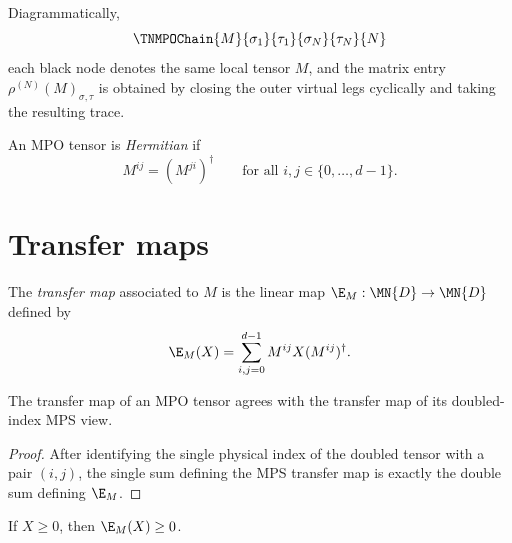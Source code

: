 Diagrammatically,
\[
    \TNMPOChain{M}{\sigma_1}{\tau_1}{\sigma_N}{\tau_N}{N}
\]
each black node denotes the same local tensor $M$, and the matrix entry
$\rho^{(N)}(M)_{\sigma,\tau}$ is obtained by closing the outer virtual
legs cyclically and taking the resulting trace.

\begin{definition}\label{def:mpo_hermitian}
    \leanok
    An MPO tensor is \emph{Hermitian} if
    \[
        M^{ij} = (M^{ji})^\dagger
        \qquad \text{for all } i,j \in \{0,\ldots,d{-}1\}.
    \]
\end{definition}

\section{Transfer maps}

\begin{definition}\label{def:mpo_transfer_map}
    \leanok
    The \emph{transfer map} associated to $M$ is the linear map
    $\E_M : \MN{D} \to \MN{D}$ defined by
    \[
        \E_M(X) = \sum_{i,j=0}^{d-1} M^{ij} X (M^{ij})^\dagger.
    \]
\end{definition}

\begin{lemma}\label{lem:mpo_transfer_eq_mps}
    \leanok
    The transfer map of an MPO tensor agrees with the transfer map of its
    doubled-index MPS view.
\end{lemma}

\begin{proof}
    \leanok
    After identifying the single physical index of the doubled tensor with a
    pair $(i,j)$, the single sum defining the MPS transfer map is exactly the
    double sum defining $\E_M$.
\end{proof}

\begin{theorem}\label{thm:mpo_transfer_pos}
    \leanok
    If $X \ge 0$, then $\E_M(X) \ge 0$.
\end{theorem}

